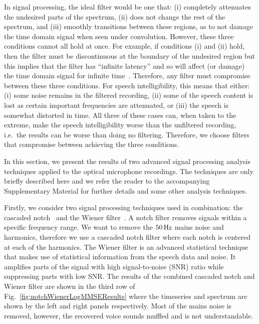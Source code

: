 \documentclass[paper-main.tex]{subfiles}
\begin{document}
In signal processing, the ideal filter would be one that:
(i) completely attenuates the undesired parts of the spectrum, 
(ii) does not change the rest of the spectrum, and 
(iii) smoothly transitions between these regions, as to not damage the time domain signal when seen under convolution. 
However, these three conditions cannot all hold at once. For example, if conditions (i) and (ii) hold, then the filter must be discontinuous at the boundary of the undesired region but this implies that the filter has ``infinite latency'' and so will affect (or damage) the time domain signal for infinite time~\cite{10.5555/151045}. Therefore, any filter must compromise between these three conditions. For speech intelligibility, this means that either: (i) some noise remains in the filtered recording, (ii) some of the speech content is lost as certain important frequencies are attenuated, or (iii) the speech is somewhat distorted in time.
All three of these cases can, when taken to the extreme, make the speech intelligibility worse than the unfiltered recording, i.e.\ the results can be worse than doing no filtering. Therefore, we choose filters that compromise between achieving the three conditions.


In this section, we present the results of two advanced signal processing analysis techniques applied to the optical microphone recordings. 
The techniques are only briefly described here and we refer the reader to the accompanying Supplementary Material for further details and some other analysis techniques. 


Firstly, we consider two signal processing techniques used in combination: the cascaded notch~\cite{10.5555/541204} and the Wiener filter~\cite{10.5555/151045}. 
A notch filter removes signals within a specific frequency range. 
We want to remove the $50\,{\rm Hz}$ mains noise and harmonics, therefore we use a cascaded notch filter where each notch is centered at each of the harmonics. 
The Wiener filter is an advanced statistical technique that makes use of statistical information from the speech data and noise. 
It amplifies parts of the signal with high signal-to-noise (SNR) ratio while suppressing parts with low SNR. 
The results of the combined cascaded notch and Wiener filter are shown in the third row of Fig.~\ref{fig:notchWienerLogMMSEResults} where the timeseries and spectrum are shown by the left and right panels respectively. 
Most of the mains noise is removed, however, the recovered voice sounds muffled and is not understandable. 
\end{document}
